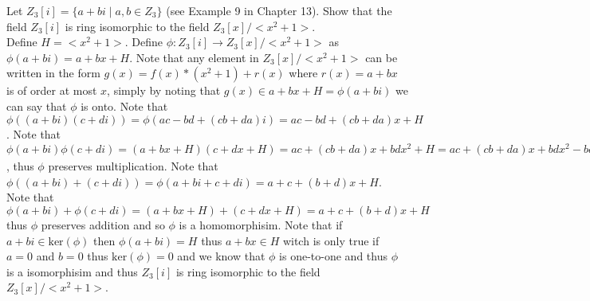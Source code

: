 \documentclass[12pt]{article}
\makeatletter
\theoremstyle{homework}
\newenvironment{exercise}[1]
{\def\@currentlabel{#1}\exercisecore}
{\endexercisecore}
\makeatother
\begin{document}
\begin{exercise}{15.12}
Let $Z_3[i] = \{a + bi \mid a, b \in Z_3 \}$ (see Example 9 in Chapter 13). Show that the field $Z_3[i]$ is ring isomorphic to the field $Z_3[x]/<x^2 + 1>$.\\
Define $H=<x^2+1>$.  Define $\phi:Z_3[i]\rightarrow Z_3[x]/<x^2 + 1>$ as $\phi(a+bi)= a+bx+H$.  Note that any element in $Z_3[x]/<x^2 + 1>$ can be written in the form $g(x)=f(x)*(x^2+1)+r(x)$ where $r(x)=a+bx$ is of order at most $x$, simply by noting that $g(x)\in a+bx+H=\phi(a+bi)$ we can say that $\phi$ is onto.  Note that $\phi((a+bi)(c+di))=\phi(ac-bd+(cb+da)i)=ac-bd+(cb+da)x+H$.  Note that $\phi(a+bi)\phi(c+di)=(a+bx+H)(c+dx+H)=ac+(cb+da)x+bdx^2+H=ac+(cb+da)x+bdx^2-bd(x^2+1)+H=ac-bd+(cb+da)x+H$, thus $\phi$ preserves multiplication.  Note that $\phi((a+bi)+(c+di))=\phi(a+bi+c+di)=a+c+(b+d)x+H$.  Note that $\phi(a+bi)+\phi(c+di)=(a+bx+H)+(c+dx+H)=a+c+(b+d)x+H$ thus $\phi$ preserves addition and so $\phi$ is a homomorphisim.  Note that if $a+bi\in\text{ker}(\phi)$ then $\phi(a+bi)=H$ thus $a+bx\in H$ witch is only true if $a=0$ and $b=0$ thus $\text{ker}(\phi)=0$ and we know that $\phi$ is one-to-one and thus $\phi$ is a isomorphisim and thus $Z_3[i]$ is ring isomorphic to the field $Z_3[x]/<x^2 + 1>$.
\end{exercise}
\end{document}

